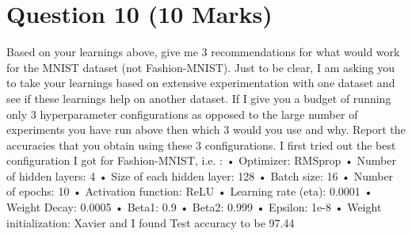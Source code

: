 \documentclass{article}
\begin{document}
{{\section{Question 10 (10 Marks)}
Based on your learnings above, give me 3 recommendations for what would work for the MNIST dataset (not Fashion-MNIST). Just to be clear, I am asking you to take your learnings based on extensive experimentation with one dataset and see if these learnings help on another dataset. If I give you a budget of running only 3 hyperparameter configurations as opposed to the large number of experiments you have run above then which 3 would you use and why. Report the accuracies that you obtain using these 3 configurations. 
I first tried out the best configuration I got for Fashion-MNIST, i.e. :	•	Optimizer: RMSprop
	•	Number of hidden layers: 4
	•	Size of each hidden layer: 128
	•	Batch size: 16
	•	Number of epochs: 10
	•	Activation function: ReLU
	•	Learning rate (eta): 0.0001
	•	Weight Decay: 0.0005
	•	Beta1: 0.9
	•	Beta2: 0.999
	•	Epsilon: 1e-8
	•	Weight initialization: Xavier
and I found Test accuracy to be 97.44%
}}
\end{document}
